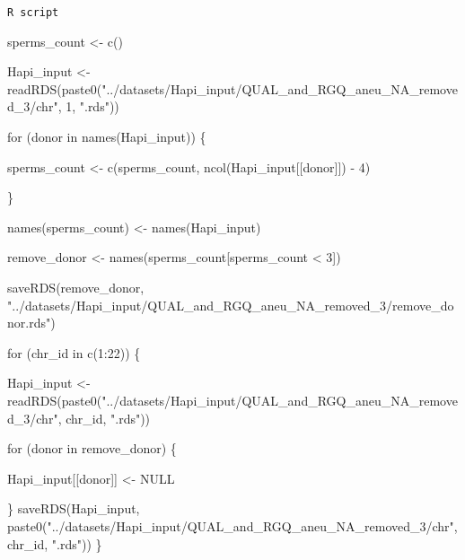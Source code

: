 \documentclass[
  letterpaper,
  DIV=11,
  numbers=noendperiod]{scrreprt}
\newenvironment{Shaded}{\begin{snugshade}}{\end{snugshade}}
\newcommand{\ConstantTok}[1]{\textcolor[rgb]{0.56,0.35,0.01}{#1}}
\newcommand{\ControlFlowTok}[1]{\textcolor[rgb]{0.00,0.23,0.31}{#1}}
\newcommand{\DecValTok}[1]{\textcolor[rgb]{0.68,0.00,0.00}{#1}}
\newcommand{\FunctionTok}[1]{\textcolor[rgb]{0.28,0.35,0.67}{#1}}
\newcommand{\NormalTok}[1]{\textcolor[rgb]{0.00,0.23,0.31}{#1}}
\newcommand{\OtherTok}[1]{\textcolor[rgb]{0.00,0.23,0.31}{#1}}
\newcommand{\SpecialCharTok}[1]{\textcolor[rgb]{0.37,0.37,0.37}{#1}}
\newcommand{\StringTok}[1]{\textcolor[rgb]{0.13,0.47,0.30}{#1}}
\begin{document}
\begin{codelisting}

\caption{\texttt{R script}}

\begin{Shaded}
\begin{Highlighting}[]
\NormalTok{sperms\_count }\OtherTok{\textless{}{-}} \FunctionTok{c}\NormalTok{()}

\NormalTok{Hapi\_input }\OtherTok{\textless{}{-}} \FunctionTok{readRDS}\NormalTok{(}\FunctionTok{paste0}\NormalTok{(}\StringTok{"../datasets/Hapi\_input/QUAL\_and\_RGQ\_aneu\_NA\_removed\_3/chr"}\NormalTok{, }\DecValTok{1}\NormalTok{, }\StringTok{".rds"}\NormalTok{))}

\ControlFlowTok{for}\NormalTok{ (donor }\ControlFlowTok{in} \FunctionTok{names}\NormalTok{(Hapi\_input)) \{}
  
\NormalTok{    sperms\_count }\OtherTok{\textless{}{-}} \FunctionTok{c}\NormalTok{(sperms\_count, }\FunctionTok{ncol}\NormalTok{(Hapi\_input[[donor]]) }\SpecialCharTok{{-}} \DecValTok{4}\NormalTok{)}
    
\NormalTok{\}}

\FunctionTok{names}\NormalTok{(sperms\_count) }\OtherTok{\textless{}{-}} \FunctionTok{names}\NormalTok{(Hapi\_input)}

\NormalTok{remove\_donor }\OtherTok{\textless{}{-}} \FunctionTok{names}\NormalTok{(sperms\_count[sperms\_count }\SpecialCharTok{\textless{}} \DecValTok{3}\NormalTok{])}

\FunctionTok{saveRDS}\NormalTok{(remove\_donor, }\StringTok{"../datasets/Hapi\_input/QUAL\_and\_RGQ\_aneu\_NA\_removed\_3/remove\_donor.rds"}\NormalTok{)}


\ControlFlowTok{for}\NormalTok{ (chr\_id }\ControlFlowTok{in} \FunctionTok{c}\NormalTok{(}\DecValTok{1}\SpecialCharTok{:}\DecValTok{22}\NormalTok{)) \{}
  
\NormalTok{  Hapi\_input }\OtherTok{\textless{}{-}} \FunctionTok{readRDS}\NormalTok{(}\FunctionTok{paste0}\NormalTok{(}\StringTok{"../datasets/Hapi\_input/QUAL\_and\_RGQ\_aneu\_NA\_removed\_3/chr"}\NormalTok{, chr\_id, }\StringTok{".rds"}\NormalTok{))}
  
  \ControlFlowTok{for}\NormalTok{ (donor }\ControlFlowTok{in}\NormalTok{ remove\_donor) \{}
    
\NormalTok{    Hapi\_input[[donor]] }\OtherTok{\textless{}{-}} \ConstantTok{NULL}
    
\NormalTok{  \}}
  \FunctionTok{saveRDS}\NormalTok{(Hapi\_input, }\FunctionTok{paste0}\NormalTok{(}\StringTok{"../datasets/Hapi\_input/QUAL\_and\_RGQ\_aneu\_NA\_removed\_3/chr"}\NormalTok{, chr\_id, }\StringTok{".rds"}\NormalTok{))}
\NormalTok{\}}
\end{Highlighting}
\end{Shaded}

\end{codelisting}
\end{document}
